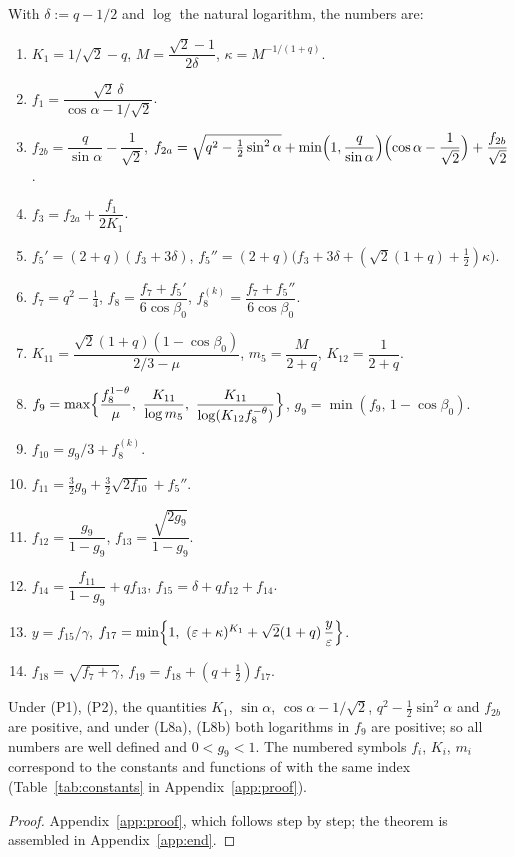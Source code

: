 \documentclass[11pt]{amsart}
\theoremstyle{remark}
\theoremstyle{plain}
\newcommand{\eps}{\varepsilon}
\begin{document}
With $\delta:=q-1/2$ and $\log$ the natural logarithm, the numbers are:
\begin{enumerate}[label=\arabic*.,leftmargin=*,itemsep=2pt]
\item $K_1=1/\sqrt2-q$, \quad $M=\dfrac{\sqrt2-1}{2\delta}$, \quad $\kappa=M^{-1/(1+q)}$.
\item $f_1=\dfrac{\sqrt2\,\delta}{\cos\alpha-1/\sqrt2}$.
\item $f_{2b}=\dfrac{q}{\sin\alpha}-\dfrac1{\sqrt2}$, \quad $f_{2a}=\sqrt{q^2-\tfrac12\sin^2\alpha}+\min\Bigl(1,\dfrac{q}{\sin\alpha}\Bigr)\Bigl(\cos\alpha-\dfrac1{\sqrt2}\Bigr)+\dfrac{f_{2b}}{\sqrt2}$.
\item $f_3=f_{2a}+\dfrac{f_1}{2K_1}$.
\item $f_5'=(2+q)(f_3+3\delta)$, \quad $f_5''=(2+q)\bigl(f_3+3\delta+(\sqrt2(1+q)+\tfrac12)\kappa\bigr)$.
\item $f_7=q^2-\tfrac14$, \quad $f_8=\dfrac{f_7+f_5'}{6\cos\beta_0}$, \quad $f_8^{(k)}=\dfrac{f_7+f_5''}{6\cos\beta_0}$.
\item $K_{11}=\dfrac{\sqrt2(1+q)(1-\cos\beta_0)}{2/3-\mu}$, \quad $m_5=\dfrac{M}{2+q}$, \quad $K_{12}=\dfrac1{2+q}$.
\item $f_9=\max\Bigl\{\dfrac{f_8^{1-\theta}}{\mu},\ \dfrac{K_{11}}{\log m_5},\ \dfrac{K_{11}}{\log(K_{12}f_8^{-\theta})}\Bigr\}$, \quad $g_9=\min(f_9,\,1-\cos\beta_0)$.
\item $f_{10}=g_9/3+f_8^{(k)}$.
\item $f_{11}=\tfrac32g_9+\tfrac32\sqrt{2f_{10}}+f_5''$.
\item $f_{12}=\dfrac{g_9}{1-g_9}$, \quad $f_{13}=\dfrac{\sqrt{2g_9}}{1-g_9}$.
\item $f_{14}=\dfrac{f_{11}}{1-g_9}+qf_{13}$, \quad $f_{15}=\delta+qf_{12}+f_{14}$.
\item $y=f_{15}/\gamma$, \quad $f_{17}=\min\Bigl\{1,\ (\eps+\kappa)^{K_1}+\sqrt2(1+q)\,\dfrac{y}{\eps}\Bigr\}$.
\item $f_{18}=\sqrt{f_7+\gamma}$, \quad $f_{19}=f_{18}+(q+\tfrac12)f_{17}$.
\end{enumerate}
Under (P1), (P2), the quantities $K_1$, $\sin\alpha$, $\cos\alpha-1/\sqrt2$, $q^2-\frac12\sin^2\alpha$ and $f_{2b}$ are positive, and under (L8a), (L8b) both logarithms in $f_9$ are positive; so all numbers are well defined and $0<g_9<1$. The numbered symbols $f_i$, $K_i$, $m_i$ correspond to the constants and functions of \cite{Bir00b} with the same index (Table~\ref{tab:constants} in Appendix~\ref{app:proof}).

\begin{proof}
Appendix~\ref{app:proof}, which follows \cite{Bir00b} step by step; the theorem is assembled in Appendix~\ref{app:end}.
\end{proof}
\end{document}
